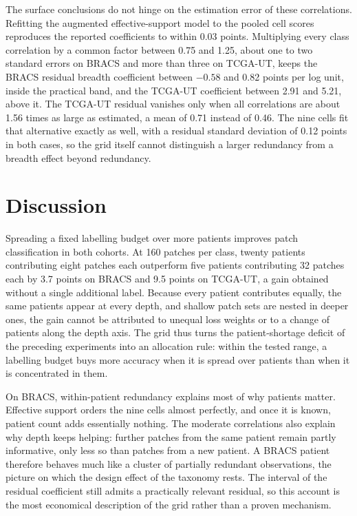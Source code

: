 The surface conclusions do not hinge on the estimation error of these correlations. Refitting the augmented effective-support model to the pooled cell scores reproduces the reported coefficients to within 0.03 points. Multiplying every class correlation by a common factor between 0.75 and 1.25, about one to two standard errors on BRACS and more than three on TCGA-UT, keeps the BRACS residual breadth coefficient between $-0.58$ and 0.82 points per log unit, inside the practical band, and the TCGA-UT coefficient between 2.91 and 5.21, above it. The TCGA-UT residual vanishes only when all correlations are about 1.56 times as large as estimated, a mean of 0.71 instead of 0.46. The nine cells fit that alternative exactly as well, with a residual standard deviation of 0.12 points in both cases, so the grid itself cannot distinguish a larger redundancy from a breadth effect beyond redundancy.

\section{Discussion}
\label{sec:discussion}
Spreading a fixed labelling budget over more patients improves patch classification in both cohorts. At 160 patches per class, twenty patients contributing eight patches each outperform five patients contributing 32 patches each by 3.7 points on BRACS and 9.5 points on TCGA-UT, a gain obtained without a single additional label. Because every patient contributes equally, the same patients appear at every depth, and shallow patch sets are nested in deeper ones, the gain cannot be attributed to unequal loss weights or to a change of patients along the depth axis. The grid thus turns the patient-shortage deficit of the preceding experiments into an allocation rule: within the tested range, a labelling budget buys more accuracy when it is spread over patients than when it is concentrated in them.

On BRACS, within-patient redundancy explains most of why patients matter. Effective support orders the nine cells almost perfectly, and once it is known, patient count adds essentially nothing. The moderate correlations also explain why depth keeps helping: further patches from the same patient remain partly informative, only less so than patches from a new patient. A BRACS patient therefore behaves much like a cluster of partially redundant observations, the picture on which the design effect of the taxonomy rests. The interval of the residual coefficient still admits a practically relevant residual, so this account is the most economical description of the grid rather than a proven mechanism.


